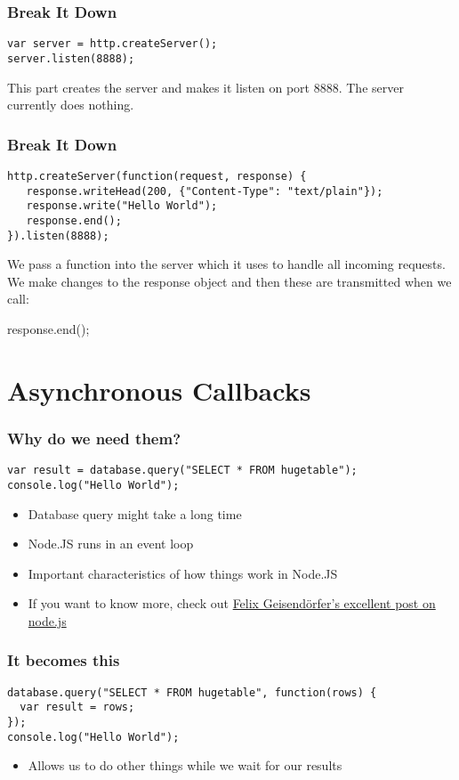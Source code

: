 \documentclass[ignorenonframetext,]{beamer}
\begin{document}
\begin{frame}[fragile]\frametitle{Break It Down}

\begin{verbatim}
var server = http.createServer();
server.listen(8888); 
\end{verbatim}
This part creates the server and makes it listen on port 8888. The
server currently does nothing.

\end{frame}

\begin{frame}[fragile]\frametitle{Break It Down}

\begin{verbatim}
http.createServer(function(request, response) {
   response.writeHead(200, {"Content-Type": "text/plain"});
   response.write("Hello World");
   response.end();
}).listen(8888);
\end{verbatim}
We pass a function into the server which it uses to handle all incoming
requests. We make changes to the response object and then these are
transmitted when we call:

response.end();

\end{frame}

\section{Asynchronous Callbacks}

\begin{frame}[fragile]\frametitle{Why do we need them?}

\begin{verbatim}
var result = database.query("SELECT * FROM hugetable");
console.log("Hello World");
\end{verbatim}
\begin{itemize}
\item
  Database query might take a long time
\item
  Node.JS runs in an event loop
\item
  Important characteristics of how things work in Node.JS
\item
  If you want to know more, check out
  \href{http://debuggable.com/posts/understanding-node-js:4bd98440-45e4-4a9a-8ef7-0f7ecbdd56cb}{Felix
  Geisendörfer's excellent post on node.js}
\end{itemize}
\end{frame}

\begin{frame}[fragile]\frametitle{It becomes this}

\begin{verbatim}
database.query("SELECT * FROM hugetable", function(rows) {
  var result = rows;
});
console.log("Hello World");
\end{verbatim}
\begin{itemize}
\item
  Allows us to do other things while we wait for our results
\end{itemize}
\end{frame}
\end{document}

